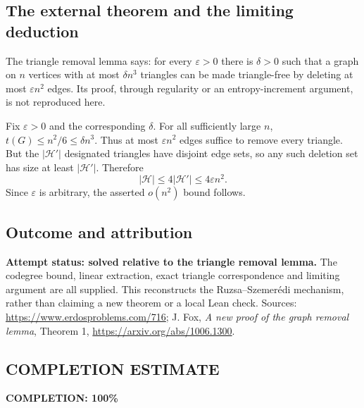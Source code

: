 \subsection*{The external theorem and the limiting deduction}
The triangle removal lemma says: for every $\varepsilon>0$ there is $\delta>0$ such that a graph on $n$ vertices with at most $\delta n^3$ triangles can be made triangle-free by deleting at most $\varepsilon n^2$ edges. Its proof, through regularity or an entropy-increment argument, is not reproduced here.

Fix $\varepsilon>0$ and the corresponding $\delta$. For all sufficiently large $n$,
$t(G)\leq n^2/6\leq\delta n^3$. Thus at most $\varepsilon n^2$ edges suffice to remove every triangle. But the $|\mathcal H'|$ designated triangles have disjoint edge sets, so any such deletion set has size at least $|\mathcal H'|$. Therefore
\[
 |\mathcal H|\leq4|\mathcal H'|\leq4\varepsilon n^2.
\]
Since $\varepsilon$ is arbitrary, the asserted $o(n^2)$ bound follows.

\subsection*{Outcome and attribution}
\textbf{Attempt status: solved relative to the triangle removal lemma.} The codegree bound, linear extraction, exact triangle correspondence and limiting argument are all supplied. This reconstructs the Ruzsa--Szemer\'edi mechanism, rather than claiming a new theorem or a local Lean check.
Sources: \url{https://www.erdosproblems.com/716}; J. Fox, \emph{A new proof of the graph removal lemma}, Theorem 1, \url{https://arxiv.org/abs/1006.1300}.

\subsection*{COMPLETION ESTIMATE}
\textbf{COMPLETION: 100\%}
